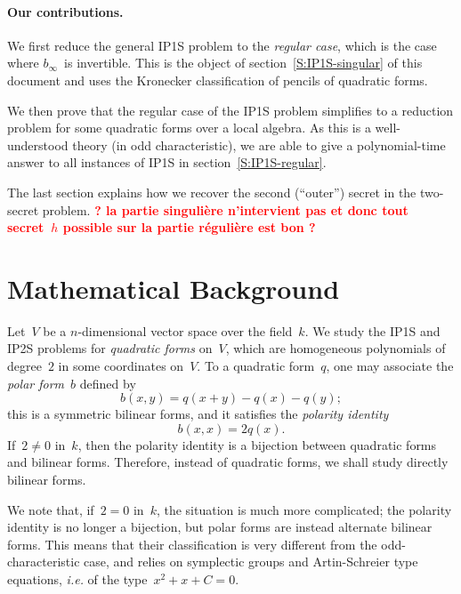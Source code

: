 \documentclass{lms}%
\def\commentaire#1{{\bfseries\textcolor{red}{#1}}}
\begin{document}
\paragraph*{Our contributions.}%
We first reduce the general IP1S problem to the \emph{regular case},
which is the case where $b_{∞}$~is invertible. This is the object of
section~\ref{S:IP1S-singular} of this document and uses the Kronecker
classification of pencils of quadratic forms.

We then prove that the regular case of the IP1S problem simplifies to a
reduction problem for some quadratic forms over a local algebra. As this
is a well-understood theory (in odd characteristic), we are able to give
a polynomial-time answer to all instances of IP1S in
section~\ref{S:IP1S-regular}.

The last section explains how we recover the second (``outer'') secret in
the two-secret problem.
\commentaire{ ? la partie singulière n'intervient pas et donc tout
secret~$h$ possible sur la partie régulière est bon ?}

\section{Mathematical Background}%
Let~$V$ be a $n$-dimensional vector space over the field~$k$. We study
the IP1S and IP2S problems for \emph{quadratic forms} on~$V$, which are
homogeneous polynomials of degree~$2$ in some coordinates on~$V$. To a
quadratic form~$q$, one may associate the \emph{polar form}~$b$ defined
by
\begin{equation*}\label{eq:polar}
b(x,y) = q(x+y) - q(x) - q(y);
\end{equation*}
this is a symmetric bilinear forms, and it satisfies the \emph{polarity
identity}
\begin{equation*}\label{eq:polarity}
b(x,x) = 2q(x).
\end{equation*}
If~$2 ≠ 0$ in~$k$, then the polarity identity is a bijection between
quadratic forms and bilinear forms. Therefore, instead of quadratic
forms, we shall study directly bilinear forms.

We note that, if~$2 = 0$ in~$k$, the situation is much more complicated;
the polarity identity is no longer a bijection, but polar forms are
instead alternate bilinear forms. This means that their classification is
very different from the odd-characteristic case, and relies on symplectic
groups and Artin-Schreier type equations, \emph{i.e.} of the
type~$x^2+x+C = 0$.
\end{document}
